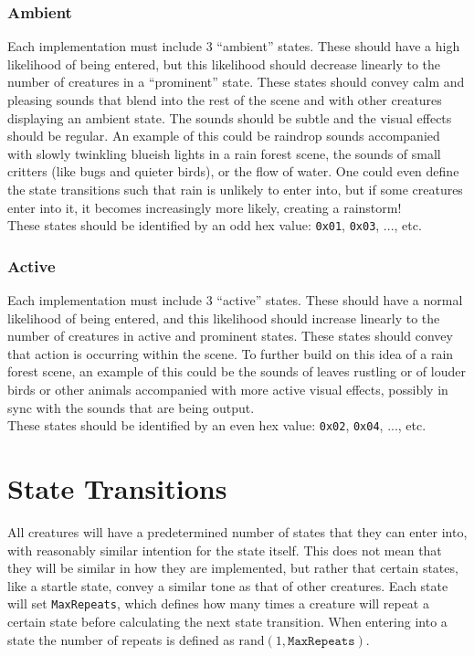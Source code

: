 \documentclass{article}
\newcommand\code{\texttt}
\newcommand\hex[1]{\texttt{0x#1}}
\newcommand\rand{\text{rand}}
\begin{document}
\subsubsection{Ambient}
Each implementation must include 3 ``ambient'' states. These should have a high likelihood of being entered, but this likelihood should decrease linearly to the number of creatures in a ``prominent'' state. These states should convey calm and pleasing sounds that blend into the rest of the scene and with other creatures displaying an ambient state. The sounds should be subtle and the visual effects should be regular. An example of this could be raindrop sounds accompanied with slowly twinkling blueish lights in a rain forest scene, the sounds of small critters (like bugs and quieter birds), or the flow of water. One could even define the state transitions such that rain is unlikely to enter into, but if some creatures enter into it, it becomes increasingly more likely, creating a rainstorm!\\
These states should be identified by an odd hex value: \hex{01}, \hex{03}, ..., etc.

\subsubsection{Active}
Each implementation must include 3 ``active'' states. These should have a normal likelihood of being entered, and this likelihood should increase linearly to the number of creatures in active and prominent states. These states should convey that action is occurring within the scene. To further build on this idea of a rain forest scene, an example of this could be the sounds of leaves rustling or of louder birds or other animals accompanied with more active visual effects, possibly in sync with the sounds that are being output.\\
These states should be identified by an even hex value: \hex{02}, \hex{04}, ..., etc.

\clearpage
\section{State Transitions}
All creatures will have a predetermined number of states that they can enter into, with reasonably similar intention for the state itself. This does not mean that they will be similar in how they are implemented, but rather that certain states, like a startle state, convey a similar tone as that of other creatures. Each state will set \code{MaxRepeats}, which defines how many times a creature will repeat a certain state before calculating the next state transition. When entering into a state the number of repeats is defined as $\rand(1, \code{MaxRepeats})$.\\
\end{document}

